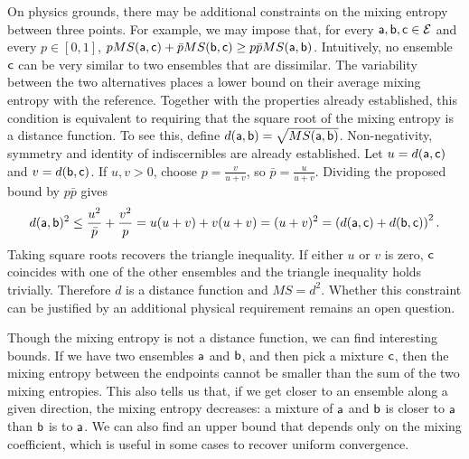 \begin{mathSection}
\begin{remark}
	On physics grounds, there may be additional constraints on the mixing entropy between three points. For example, we may impose that, for every $\ens[a],\ens[b],\ens[c]\in\Ens$ and every $p\in[0,1]$, $pMS(\ens[a],\ens[c])+\bar{p}MS(\ens[b],\ens[c]) \geq p\bar{p}MS(\ens[a],\ens[b])$.
	Intuitively, no ensemble $\ens[c]$ can be very similar to two ensembles that are dissimilar. The variability between the two alternatives places a lower bound on their average mixing entropy with the reference. Together with the properties already established, this condition is equivalent to requiring that the square root of the mixing entropy is a distance function. To see this, define $d(\ens[a],\ens[b])=\sqrt{MS(\ens[a],\ens[b])}$. Non-negativity, symmetry and identity of indiscernibles are already established. Let $u=d(\ens[a],\ens[c])$ and $v=d(\ens[b],\ens[c])$. If $u,v>0$, choose $p=\frac{v}{u+v}$, so $\bar{p}=\frac{u}{u+v}$. Dividing the proposed bound by $p\bar{p}$ gives
	\begin{equation}
		d(\ens[a],\ens[b])^2
		\leq \frac{u^2}{\bar{p}}+\frac{v^2}{p}
		= u(u+v)+v(u+v)=(u+v)^2=\left(d(\ens[a],\ens[c]) + d(\ens[b],\ens[c])\right)^2.
	\end{equation}
	Taking square roots recovers the triangle inequality. If either $u$ or $v$ is zero, $\ens[c]$ coincides with one of the other ensembles and the triangle inequality holds trivially. Therefore $d$ is a distance function and $MS=d^2$. Whether this constraint can be justified by an additional physical requirement remains an open question.
\end{remark}
\end{mathSection}

Though the mixing entropy is not a distance function, we can find interesting bounds. If we have two ensembles $\ens[a]$ and $\ens[b]$, and then pick a mixture $\ens[c]$, then the mixing entropy between the endpoints cannot be smaller than the sum of the two mixing entropies. This also tells us that, if we get closer to an ensemble along a given direction, the mixing entropy decreases: a mixture of $\ens[a]$ and $\ens[b]$ is closer to $\ens[a]$ than $\ens[b]$ is to $\ens[a]$. We can also find an upper bound that depends only on the mixing coefficient, which is useful in some cases to recover uniform convergence.

